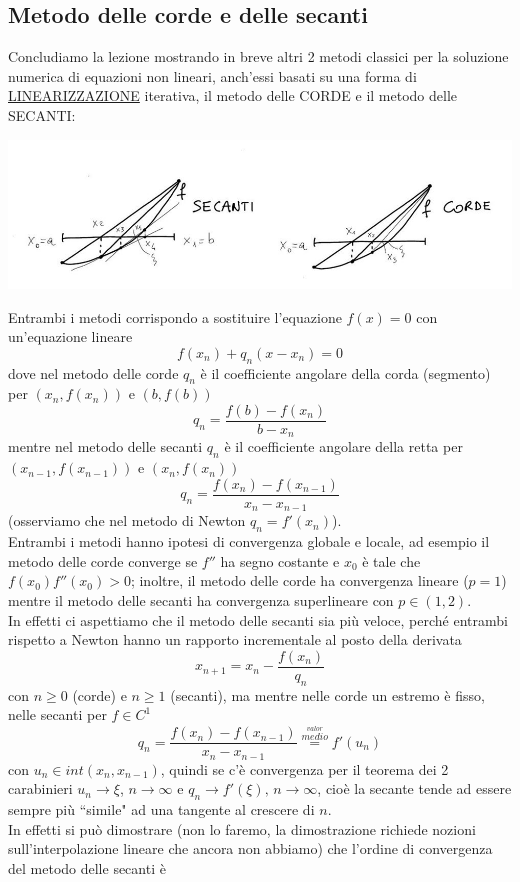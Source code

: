 \subsection{Metodo delle corde e delle secanti}
Concludiamo la lezione mostrando in breve altri 2 metodi classici per la soluzione numerica di equazioni non lineari, anch'essi basati su una forma di \uline{LINEARIZZAZIONE} iterativa, il metodo delle CORDE e il metodo delle SECANTI:
\begin{center}
\includegraphics[width=\textwidth]{foto/pag36}
\end{center}
Entrambi i metodi corrispondo a sostituire l'equazione $f(x)=0$ con un'equazione lineare
\[ f(x_n)+q_n(x-x_n)=0 \]
dove nel metodo delle corde $q_n$ è il coefficiente angolare della corda (segmento) per $(x_n,f(x_n))$ e $(b,f(b))$
\[ q_n=\frac{f(b)-f(x_n)}{b-x_n} \]
mentre nel metodo delle secanti $q_n$ è il coefficiente angolare della retta per $(x_{n-1},f(x_{n-1}))$ e $(x_n,f(x_n))$
\[ q_n=\frac{f(x_n)-f(x_{n-1})}{x_n-x_{n-1}} \]
(osserviamo che nel metodo di Newton $q_n=f'(x_n)$).\\
Entrambi i metodi hanno ipotesi di convergenza globale e locale, ad esempio il metodo delle corde converge se $f''$ ha segno costante e $x_0$ è tale che $f(x_0)f''(x_0)>0$; inoltre, il metodo delle corde ha convergenza lineare ($p=1$) mentre il metodo delle secanti ha convergenza superlineare con $p\in(1,2)$. \\
In effetti ci aspettiamo che il metodo delle secanti sia più veloce, perché entrambi rispetto a Newton hanno un rapporto incrementale al posto della derivata
\[ x_{n+1}=x_n-\frac{f(x_n)}{q_n} \]
con $n\geq0$ (corde) e $n\geq1$ (secanti), ma mentre nelle corde un estremo è fisso, nelle secanti per $f\in C^1$
\[ q_n=\frac{f(x_n)-f(x_{n-1})}{x_n-x_{n-1}}\overset{\overset{valor}{medio}}{=} f'(u_n) \]
con $u_n\in int(x_n,x_{n-1})$, quindi se c'è convergenza per il teorema dei 2 carabinieri $u_n\rightarrow\xi$, $n\rightarrow\infty$ e $q_n \rightarrow f'(\xi),\, n\rightarrow\infty$, cioè la secante tende ad essere sempre più ``simile" ad una tangente al crescere di $n$.\\In effetti si può dimostrare (non lo faremo, la dimostrazione richiede nozioni sull'interpolazione lineare che ancora non abbiamo) che l'ordine di convergenza del metodo delle secanti è
